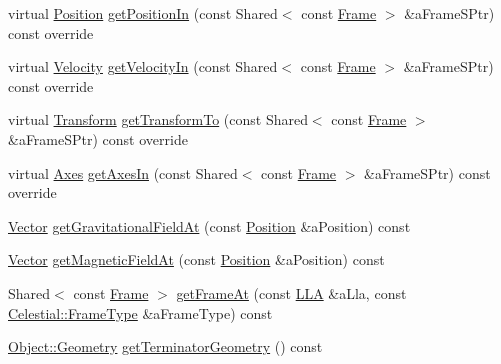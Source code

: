 \begin{DoxyCompactItemize}
\item 
virtual \hyperlink{classlibrary_1_1physics_1_1coord_1_1_position}{Position} \hyperlink{classlibrary_1_1physics_1_1env_1_1obj_1_1_celestial_aa2a209f37414e24303c21d994396664f}{get\+Position\+In} (const Shared$<$ const \hyperlink{classlibrary_1_1physics_1_1coord_1_1_frame}{Frame} $>$ \&a\+Frame\+S\+Ptr) const override
\item 
virtual \hyperlink{classlibrary_1_1physics_1_1coord_1_1_velocity}{Velocity} \hyperlink{classlibrary_1_1physics_1_1env_1_1obj_1_1_celestial_accaa3b1fdc39a1a058fd35006f31982d}{get\+Velocity\+In} (const Shared$<$ const \hyperlink{classlibrary_1_1physics_1_1coord_1_1_frame}{Frame} $>$ \&a\+Frame\+S\+Ptr) const override
\item 
virtual \hyperlink{classlibrary_1_1physics_1_1coord_1_1_transform}{Transform} \hyperlink{classlibrary_1_1physics_1_1env_1_1obj_1_1_celestial_ac6676b10ebbb63a8483137c9c734c58a}{get\+Transform\+To} (const Shared$<$ const \hyperlink{classlibrary_1_1physics_1_1coord_1_1_frame}{Frame} $>$ \&a\+Frame\+S\+Ptr) const override
\item 
virtual \hyperlink{classlibrary_1_1physics_1_1coord_1_1_axes}{Axes} \hyperlink{classlibrary_1_1physics_1_1env_1_1obj_1_1_celestial_a51d7ed3c0dcf627fbbcd81f9b190fb6b}{get\+Axes\+In} (const Shared$<$ const \hyperlink{classlibrary_1_1physics_1_1coord_1_1_frame}{Frame} $>$ \&a\+Frame\+S\+Ptr) const override
\item 
\hyperlink{classlibrary_1_1physics_1_1data_1_1_vector}{Vector} \hyperlink{classlibrary_1_1physics_1_1env_1_1obj_1_1_celestial_aa6313086a85ad19128d16f376a32aefe}{get\+Gravitational\+Field\+At} (const \hyperlink{classlibrary_1_1physics_1_1coord_1_1_position}{Position} \&a\+Position) const
\item 
\hyperlink{classlibrary_1_1physics_1_1data_1_1_vector}{Vector} \hyperlink{classlibrary_1_1physics_1_1env_1_1obj_1_1_celestial_a45b9b74291b42d8ec6421eb4d3e7c7f0}{get\+Magnetic\+Field\+At} (const \hyperlink{classlibrary_1_1physics_1_1coord_1_1_position}{Position} \&a\+Position) const
\item 
Shared$<$ const \hyperlink{classlibrary_1_1physics_1_1coord_1_1_frame}{Frame} $>$ \hyperlink{classlibrary_1_1physics_1_1env_1_1obj_1_1_celestial_ad1dfffd88b216eccf83a9441cae304be}{get\+Frame\+At} (const \hyperlink{classlibrary_1_1physics_1_1coord_1_1spherical_1_1_l_l_a}{L\+LA} \&a\+Lla, const \hyperlink{classlibrary_1_1physics_1_1env_1_1obj_1_1_celestial_a8585fb32125cb6c73ae1339a5ea09c79}{Celestial\+::\+Frame\+Type} \&a\+Frame\+Type) const
\item 
\hyperlink{classlibrary_1_1physics_1_1env_1_1_object_abdf50733c7ad97327fb64edca5670f13}{Object\+::\+Geometry} \hyperlink{classlibrary_1_1physics_1_1env_1_1obj_1_1_celestial_aa910ed14605693ee5af68d88015cd53b}{get\+Terminator\+Geometry} () const
\end{DoxyCompactItemize}
